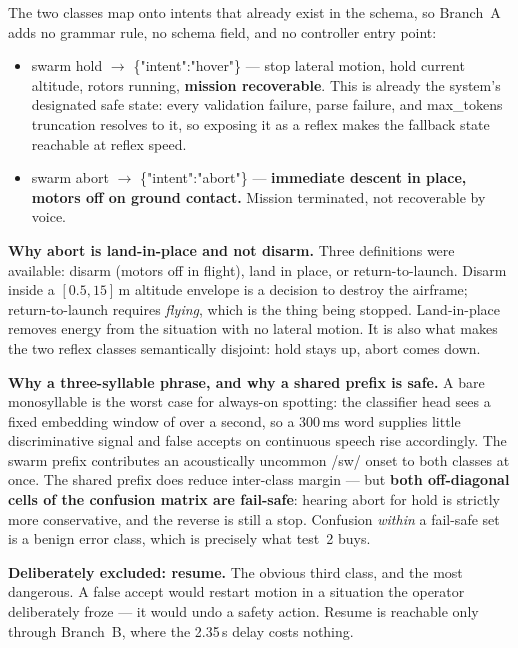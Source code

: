 \documentclass[11pt,a4paper]{article}
\newcommand{\code}[1]{{\ttfamily\small #1}}
\newcommand{\munit}[1]{\,#1}
\newenvironment{panel}
  {\par\begin{center}\begin{lrbox}{\panelbox}\begin{minipage}{0.94\textwidth}\vspace{3pt}}
  {\vspace{3pt}\end{minipage}\end{lrbox}%
   \fcolorbox{rulegray}{panelbg}{\usebox{\panelbox}}\end{center}\par}
\begin{document}
The two classes map onto intents that already exist in the schema, so Branch~A adds no grammar rule, no
schema field, and no controller entry point:

\begin{itemize}[leftmargin=1.4em,itemsep=3pt]
  \item \code{swarm hold} $\rightarrow$ \code{\{"intent":"hover"\}} --- stop lateral motion, hold current
        altitude, rotors running, \textbf{mission recoverable}. This is already the system's designated
        safe state: every validation failure, parse failure, and \code{max\_tokens} truncation resolves to
        it, so exposing it as a reflex makes the fallback state reachable at reflex speed.
  \item \code{swarm abort} $\rightarrow$ \code{\{"intent":"abort"\}} --- \textbf{immediate descent in
        place, motors off on ground contact.} Mission terminated, not recoverable by voice.
\end{itemize}

\begin{panel}
\textbf{Why \code{abort} is land-in-place and not disarm.} Three definitions were available: disarm
(motors off in flight), land in place, or return-to-launch. Disarm inside a $[0.5, 15]$\munit{m} altitude
envelope is a decision to destroy the airframe; return-to-launch requires \emph{flying}, which is the thing
being stopped. Land-in-place removes energy from the situation with no lateral motion. It is also what
makes the two reflex classes semantically disjoint: \code{hold} stays up, \code{abort} comes down.

\textbf{Why a three-syllable phrase, and why a shared prefix is safe.} A bare monosyllable is the worst
case for always-on spotting: the classifier head sees a fixed embedding window of over a second, so a
300\munit{ms} word supplies little discriminative signal and false accepts on continuous speech rise
accordingly. The \code{swarm} prefix contributes an acoustically uncommon /sw/ onset to both classes at
once. The shared prefix does reduce inter-class margin --- but \textbf{both off-diagonal cells of the
confusion matrix are fail-safe}: hearing \code{abort} for \code{hold} is strictly more conservative, and
the reverse is still a stop. Confusion \emph{within} a fail-safe set is a benign error class, which is
precisely what test~2 buys.

\textbf{Deliberately excluded: \code{resume}.} The obvious third class, and the most dangerous. A false
accept would restart motion in a situation the operator deliberately froze --- it would undo a safety
action. Resume is reachable only through Branch~B, where the 2.35\munit{s} delay costs nothing.
\end{panel}
\end{document}
